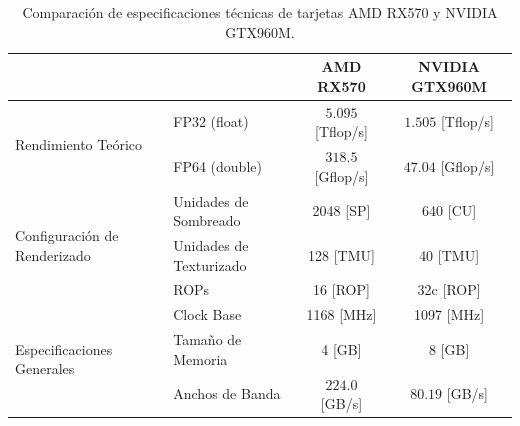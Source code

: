 \renewcommand{\arraystretch}{1.5}
\begin{table}[ht!]
\centering
\caption{Comparación de especificaciones técnicas de tarjetas AMD RX570 y NVIDIA GTX960M.}
\begin{tabularx}{\textwidth}{XX|c|c|}
\cline{3-4}
                                                                    &                         & AMD RX570             & NVIDIA GTX960M        \\ \hline
\multicolumn{1}{|l|}{\multirow{2}{*}{Rendimiento Teórico}}          & FP32 (float)            & \(5.095\) {[}Tflop/s{]} & \(1.505\) {[}Tflop/s{]} \\ \cline{2-4} 
\multicolumn{1}{|l|}{}                                              & FP64 (double)           & \(318.5\) {[}Gflop/s{]} & \(47.04\) {[}Gflop/s{]} \\ \hline
\multicolumn{1}{|l|}{\multirow{3}{*}{Configuración de Renderizado}} & Unidades de Sombreado   & 2048 {[}SP{]}         & 640 {[}CU{]}          \\ \cline{2-4} 
\multicolumn{1}{|l|}{}                                              & Unidades de Texturizado & 128 {[}TMU{]}         & 40 {[}TMU{]}          \\ \cline{2-4} 
\multicolumn{1}{|l|}{}                                              & ROPs                    & 16 {[}ROP{]}          & 32c {[}ROP{]}         \\ \hline
\multicolumn{1}{|l|}{\multirow{3}{*}{Especificaciones Generales}}   & Clock Base              & 1168 {[}MHz{]}        & 1097 {[}MHz{]}        \\ \cline{2-4} 
\multicolumn{1}{|l|}{}                                              & Tamaño de Memoria       & 4 {[}GB{]}            & 8 {[}GB{]}            \\ \cline{2-4} 
\multicolumn{1}{|l|}{}                                              & Anchos de Banda         & \(224.0\)  {[}GB/s{]}   & \(80.19\) {[}GB/s{]}    \\ \hline
\end{tabularx}
\end{table}

\iffalse


